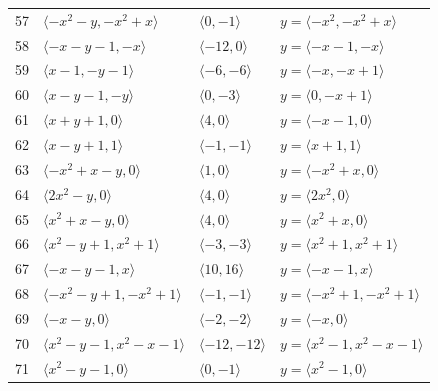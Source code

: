 \documentclass[11pt]{article}
\begin{document}
\begin{longtable}{@{}rlll@{}}
57 & $\langle -x^{2}-y,-x^{2}+x\rangle$ & $\langle 0,-1\rangle$ & $y=\langle -x^{2},-x^{2}+x\rangle$\\
58 & $\langle -x-y-1,-x\rangle$ & $\langle -12,0\rangle$ & $y=\langle -x-1,-x\rangle$\\
59 & $\langle x-1,-y-1\rangle$ & $\langle -6,-6\rangle$ & $y=\langle -x,-x+1\rangle$\\
60 & $\langle x-y-1,-y\rangle$ & $\langle 0,-3\rangle$ & $y=\langle 0,-x+1\rangle$\\
61 & $\langle x+y+1,0\rangle$ & $\langle 4,0\rangle$ & $y=\langle -x-1,0\rangle$\\
62 & $\langle x-y+1,1\rangle$ & $\langle -1,-1\rangle$ & $y=\langle x+1,1\rangle$\\
63 & $\langle -x^{2}+x-y,0\rangle$ & $\langle 1,0\rangle$ & $y=\langle -x^{2}+x,0\rangle$\\
64 & $\langle 2x^{2}-y,0\rangle$ & $\langle 4,0\rangle$ & $y=\langle 2x^{2},0\rangle$\\
65 & $\langle x^{2}+x-y,0\rangle$ & $\langle 4,0\rangle$ & $y=\langle x^{2}+x,0\rangle$\\
66 & $\langle x^{2}-y+1,x^{2}+1\rangle$ & $\langle -3,-3\rangle$ & $y=\langle x^{2}+1,x^{2}+1\rangle$\\
67 & $\langle -x-y-1,x\rangle$ & $\langle 10,16\rangle$ & $y=\langle -x-1,x\rangle$\\
68 & $\langle -x^{2}-y+1,-x^{2}+1\rangle$ & $\langle -1,-1\rangle$ & $y=\langle -x^{2}+1,-x^{2}+1\rangle$\\
69 & $\langle -x-y,0\rangle$ & $\langle -2,-2\rangle$ & $y=\langle -x,0\rangle$\\
70 & $\langle x^{2}-y-1,x^{2}-x-1\rangle$ & $\langle -12,-12\rangle$ & $y=\langle x^{2}-1,x^{2}-x-1\rangle$\\
71 & $\langle x^{2}-y-1,0\rangle$ & $\langle 0,-1\rangle$ & $y=\langle x^{2}-1,0\rangle$\\
\end{longtable}
\endgroup
\end{document}
